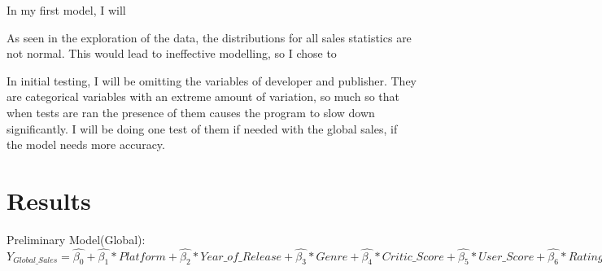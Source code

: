 \documentclass[12pt]{article}
\begin{document}
In my first model, I will 


As seen in the exploration of the data, the distributions for all sales statistics are not normal. This would lead to ineffective modelling, 
so I chose to

In initial testing, I will be omitting the variables of developer and publisher. They are categorical variables with an extreme amount of variation,
so much so that when tests are ran the presence of them causes the program to slow down significantly. I will be doing one test of them if needed with
the global sales, if the model needs more accuracy.

\section{Results}
\label{sec:resu}
Preliminary Model(Global):
$Y_{Global\_Sales}=\hat{\beta_{0}}+\hat{\beta_{1}}*Platform+\hat{\beta_{2}}*Year\_of\_Release+\hat{\beta_{3}}*Genre+\hat{\beta_{4}}*Critic\_Score+\hat{\beta_{5}}*User\_Score+\hat{\beta_{6}}*Rating$
\end{document}
